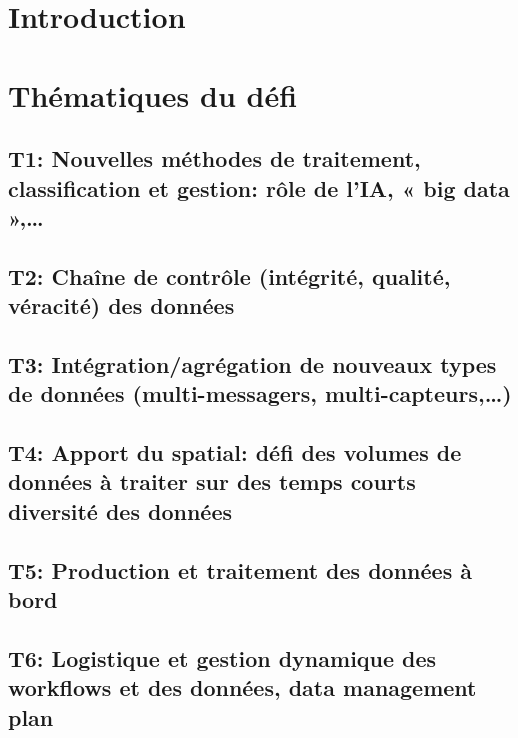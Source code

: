 \documentclass[openany, parskip=full, 12pt, a4]{scrbook}
\begin{document}
\renewcommand{\contentsname}{Table des Matières}


	


\chapter{Introduction}

\chapter{Thématiques du défi}

\section{T1: Nouvelles méthodes de traitement, classification et gestion: rôle de l’IA, « big data »,…}

\section{T2: Chaîne de contrôle (intégrité, qualité, véracité) des données}

\section{T3: Intégration/agrégation de nouveaux types de données (multi-messagers, multi-capteurs,…)}

\section{T4: Apport du spatial: défi des volumes de données à traiter sur des temps courts  diversité des données}

\section{T5: Production et traitement des données à bord}

\section{T6: Logistique et gestion dynamique des workflows et des données, data management plan}
\end{document}
